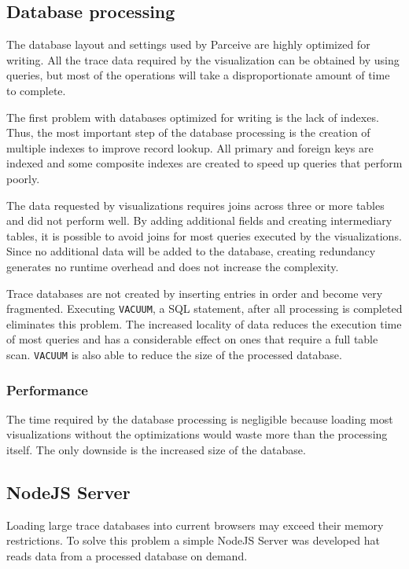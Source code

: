 \documentclass[conference]{IEEEtran}
\begin{document}
\subsection{Database processing}
\label{dataprocessing}

The database layout and settings used by Parceive are highly optimized for writing. All the trace data required by the visualization can be obtained by using queries, but most of the operations will take a disproportionate amount of time to complete.

The first problem with databases optimized for writing is the lack of indexes. Thus, the most important step of the database processing is the creation of multiple indexes to improve record lookup. All primary and foreign keys are indexed and some composite indexes are created to speed up queries that perform poorly.

The data requested by visualizations requires joins across three or more tables and did not perform well. By adding additional fields and creating intermediary tables, it is possible to avoid joins for most queries executed by the visualizations. Since no additional data will be added to the database, creating redundancy generates no runtime overhead and does not increase the complexity.

Trace databases are not created by inserting entries in order and become very fragmented. Executing \texttt{VACUUM}, a SQL statement, after all processing is completed eliminates this problem. The increased locality of data reduces the execution time of most queries and has a considerable effect on ones that require a full table scan. \texttt{VACUUM} is also able to reduce the size of the processed database.

\subsubsection*{Performance}

The time required by the database processing is negligible because loading most visualizations without the optimizations would waste more than the processing itself. The only downside is the increased size of the database.

\subsection{NodeJS Server}

Loading large trace databases into current browsers may exceed their memory restrictions. To solve this problem a simple NodeJS Server was developed hat reads data from a processed database on demand.
\end{document}

